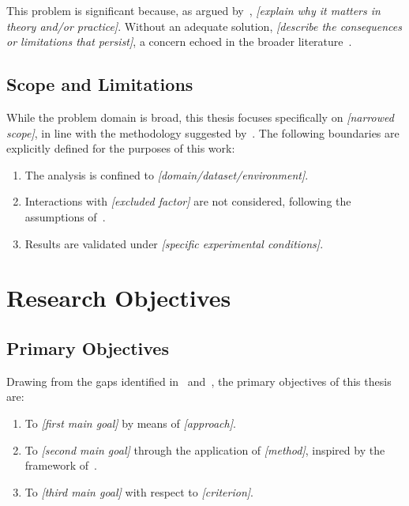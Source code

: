 This problem is significant because, as argued by~\cite{problemref2018},
\textit{[explain why it matters in theory and/or practice]}. Without an adequate
solution, \textit{[describe the consequences or limitations that persist]},
a concern echoed in the broader literature~\cite{survey2020field}.

\subsection{Scope and Limitations}
\label{subsec:scope}

While the problem domain is broad, this thesis focuses specifically on
\textit{[narrowed scope]}, in line with the methodology suggested
by~\cite{researchmethod2017}. The following boundaries are explicitly defined
for the purposes of this work:

\begin{enumerate}
    \item The analysis is confined to \textit{[domain/dataset/environment]}.
    \item Interactions with \textit{[excluded factor]} are not considered,
          following the assumptions of~\cite{author_method2019}.
    \item Results are validated under \textit{[specific experimental conditions]}.
\end{enumerate}

\section{Research Objectives}
\label{sec:objectives}

\subsection{Primary Objectives}
\label{subsec:primary-obj}

Drawing from the gaps identified in~\cite{survey2020field}
and~\cite{challenge_paper2021}, the primary objectives of this thesis are:

\begin{enumerate}
    \item To \textit{[first main goal]} by means of \textit{[approach]}.
    \item To \textit{[second main goal]} through the application of \textit{[method]},
          inspired by the framework of~\cite{author_method2019}.
    \item To \textit{[third main goal]} with respect to \textit{[criterion]}.
\end{enumerate}

